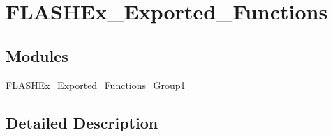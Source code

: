 \hypertarget{group___f_l_a_s_h_ex___exported___functions}{}\section{F\+L\+A\+S\+H\+Ex\+\_\+\+Exported\+\_\+\+Functions}
\label{group___f_l_a_s_h_ex___exported___functions}
\subsection*{Modules}
\begin{DoxyCompactItemize}
\item 
\hyperlink{group___f_l_a_s_h_ex___exported___functions___group1}{F\+L\+A\+S\+H\+Ex\+\_\+\+Exported\+\_\+\+Functions\+\_\+\+Group1}
\end{DoxyCompactItemize}


\subsection{Detailed Description}
